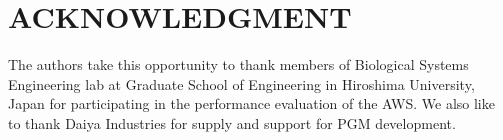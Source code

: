 \documentclass[letterpaper, 10 pt, conference]{ieeeconf}  %
\begin{document}







\section*{ACKNOWLEDGMENT}
The authors take this opportunity to thank members of Biological Systems Engineering lab at Graduate School of Engineering in Hiroshima University, Japan for participating in the performance evaluation of the AWS. We also like to thank Daiya Industries for supply and support for PGM development.  
\end{document}
